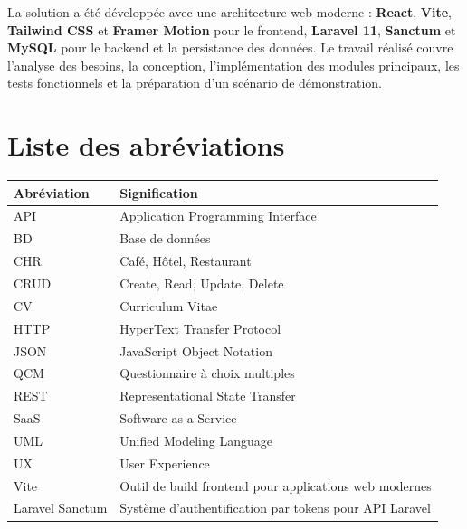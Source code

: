 \noindent
La solution a été développée avec une architecture web moderne : \textbf{React}, \textbf{Vite}, \textbf{Tailwind CSS} et \textbf{Framer Motion} pour le frontend, \textbf{Laravel 11}, \textbf{Sanctum} et \textbf{MySQL} pour le backend et la persistance des données. Le travail réalisé couvre l'analyse des besoins, la conception, l'implémentation des modules principaux, les tests fonctionnels et la préparation d'un scénario de démonstration.

\newpage

\tableofcontents

\chapter*{Liste des abréviations}

\begin{table}[h!]
\centering
\renewcommand{\arraystretch}{1.4}
\setlength{\tabcolsep}{18pt}
\begin{tabular}{|l|p{10cm}|}
\hline
\textbf{Abréviation} & \textbf{Signification} \\
\hline
API & Application Programming Interface \\
BD & Base de données \\
CHR & Café, Hôtel, Restaurant \\
CRUD & Create, Read, Update, Delete \\
CV & Curriculum Vitae \\
HTTP & HyperText Transfer Protocol \\
JSON & JavaScript Object Notation \\
QCM & Questionnaire à choix multiples \\
REST & Representational State Transfer \\
SaaS & Software as a Service \\
UML & Unified Modeling Language \\
UX & User Experience \\
Vite & Outil de build frontend pour applications web modernes \\
Laravel Sanctum & Système d'authentification par tokens pour API Laravel \\
\hline
\end{tabular}
\end{table}

\newpage

\listoffigures
{}

\newpage

\listoftables
{}
